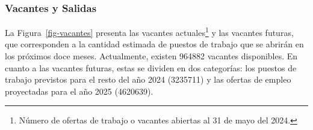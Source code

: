 \documentclass[
  11pt,
]{article}
\begin{document}
\begin{table}

\caption{\label{tbl-dotacion_resumen}Dotación actual de las empresas
segpun tipo de relación contractual}


\end{table}%

\FloatBarrier

\subsubsection{Vacantes y Salidas}\label{vacantes-y-salidas}

La Figura~\ref{fig-vacantes} presenta las vacantes actuales\footnote{Número
  de ofertas de trabajo o vacantes abiertas al 31 de mayo del 2024.} y
las vacantes futuras, que corresponden a la cantidad estimada de puestos
de trabajo que se abrirán en los próximos doce meses. Actualmente,
existen 964882 vacantes disponibles. En cuanto a las vacantes futuras,
estas se dividen en dos categorías: los puestos de trabajo previstos
para el resto del año 2024 (3235711) y las ofertas de empleo proyectadas
para el año 2025 (4620639).

\FloatBarrier
\end{document}
